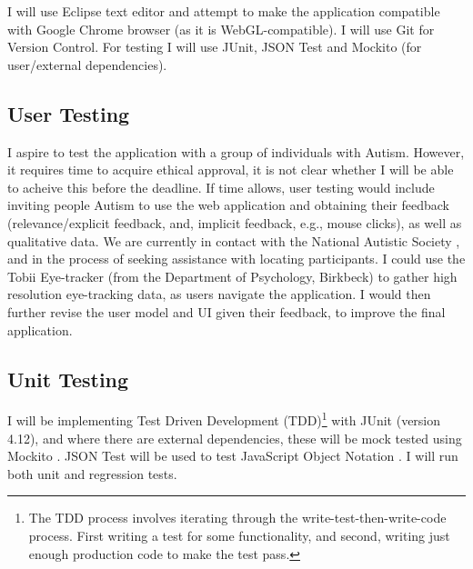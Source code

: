 \documentclass[a4paper, 10pt]{article}
\begin{document}
I will use Eclipse text editor and attempt to make the application compatible with Google Chrome browser (as it is WebGL-compatible). I will use Git for Version Control. For testing I will use JUnit, JSON Test and Mockito (for user/external dependencies).

\subsection{User Testing}
I aspire to test the application with a group of individuals with Autism. However, it requires time to acquire ethical approval, it is not clear whether I will be able to acheive this before the deadline. If time allows, user testing would include inviting people Autism to use the web application and obtaining their feedback (relevance/explicit feedback, and, implicit feedback, e.g., mouse clicks), as well as qualitative data. We are currently in contact with the National Autistic Society \cite{nas}, and in the process of seeking assistance with locating participants. I could use the Tobii Eye-tracker (from the Department of Psychology, Birkbeck) to gather high resolution eye-tracking data, as users navigate the application. I would then further revise the user model and UI given their feedback, to improve the final application.

\subsection{Unit Testing}
I will be implementing Test Driven Development (TDD)\footnote{The TDD process involves iterating through the write-test-then-write-code process. First writing a test for some functionality, and second, writing just enough production code to make the test pass.} with JUnit (version 4.12), and where there are external dependencies, these will be mock tested using Mockito \cite{mockito}. JSON Test will be used to test JavaScript Object Notation \cite{jsontest}. I will run both unit and regression tests.
\end{document}

